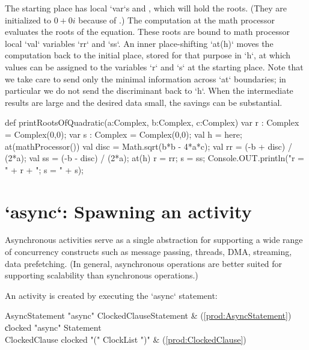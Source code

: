 The starting place has local \xcd`var`s  and , which will hold
the roots.  (They are initialized to {$0+0i$} because of
.) 
The computation at the math processor evaluates the roots of the equation.
These roots are bound to math processor local \xcd`val` variables \xcd`rr` and
\xcd`ss`.  An inner place-shifting \xcd`at(h)` moves the computation back to
the initial place, stored for that purpose in \xcd`h`, at which values can be
assigned to the variables \xcd`r` 
and \xcd`s` at the starting place.  Note that we take care to send only the
minimal information across \xcd`at` boundaries; in particular we do not 
send the discriminant back to \xcd`h`.  When the intermediate results are
large and the desired data small, the savings can be substantial.

\begin{xten}
def printRootsOfQuadratic(a:Complex, b:Complex, c:Complex) {
  var r : Complex = Complex(0,0);
  var s : Complex = Complex(0,0);
  val h = here;
  at(mathProcessor()) {
    val disc = Math.sqrt(b*b - 4*a*c);
    val rr = (-b + disc) / (2*a);
    val ss = (-b - disc) / (2*a);
    at(h) {
      r = rr; s = ss;
    }
  }
  Console.OUT.println("r = " + r + "; s = " + s);
}
\end{xten}
\section{\xcd`async`: Spawning an activity}\label{AsynchronousActivity}\label{AsyncActivity}

Asynchronous activities serve as a single abstraction for supporting a
wide range of concurrency constructs such as message passing, threads,
DMA, streaming, data prefetching. (In general, asynchronous operations
are better suited for supporting scalability than synchronous
operations.)

An activity is created by executing the \xcd`async` statement: 

\begin{bbgrammar}
 AsyncStatement    \: \xcd"async" ClockedClause\opt Statement & (\ref{prod:AsyncStatement})\\%
    \| clocked \xcd"async" Statement\\
 ClockedClause    \: clocked \xcd"(" ClockList \xcd")" & (\ref{prod:ClockedClause})\\%
\end{bbgrammar}

